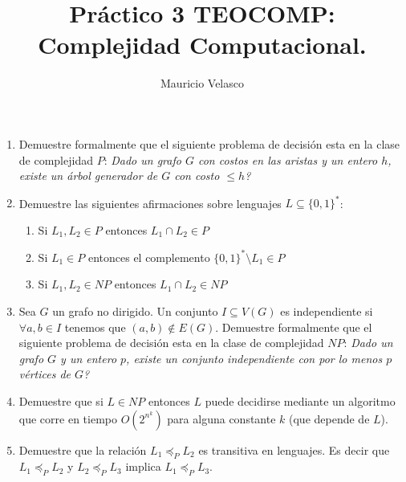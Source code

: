 \documentclass[12pt, a4paper]{article}
\date{}
\begin{document}
\title{Pr\'actico 3 TEOCOMP: Complejidad Computacional.}
\author{Mauricio Velasco}
\maketitle{}


\begin{enumerate}
\item Demuestre formalmente que el siguiente problema de decisión esta en la clase de complejidad $P$: {\it Dado un grafo $G$ con costos en las aristas y un entero $h$, existe un árbol generador de $G$ con costo $\leq h$?}

\item Demuestre las siguientes afirmaciones sobre lenguajes $L\subseteq \{0,1\}^*$:
\begin{enumerate}
\item Si $L_1,L_2\in P$ entonces $L_1\cap L_2\in P$
\item Si $L_1 \in P$ entonces el complemento $\{0,1\}^*\setminus L_1\in P$
\item Si $L_1,L_2\in NP$ entonces $L_1\cap L_2\in NP$
\end{enumerate}

\item Sea $G$ un grafo no dirigido. Un conjunto $I\subseteq V(G)$ es independiente si $\forall a,b\in I$ tenemos que $(a,b)\not\in E(G)$. Demuestre formalmente que el siguiente problema de decisión esta en la clase de complejidad $NP$: {\it Dado un grafo $G$ y un entero $p$, existe un conjunto independiente con por lo menos $p$ v\'ertices de $G$?}

\item Demuestre que si $L\in NP$ entonces $L$ puede decidirse mediante un algoritmo que corre en tiempo $O(2^{n^k})$ para alguna constante $k$ (que depende de $L$).

\item Demuestre que la relación $L_1\preceq_P L_2$ es transitiva en lenguajes. Es decir que $L_1\preceq_P L_2$ y $L_2\preceq_P L_3$ implica $L_1\preceq_P L_3$.


\end{enumerate}
\end{document}
